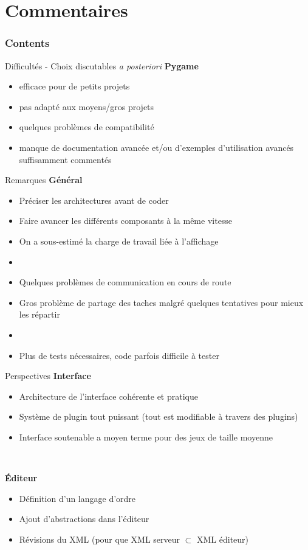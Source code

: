 \documentclass[11pt]{beamer}
\begin{document}
\section{Commentaires}

    \begin{frame}
        \frametitle{Contents}
        \tableofcontents[currentsection]
    \end{frame}
    
\begin{frame}{Difficultés - Choix discutables \textit{a posteriori}}
	\textbf{Pygame}
	\begin{itemize}
		\item efficace pour de petits projets
		\item pas adapté aux moyens/gros projets
		\item quelques problèmes de compatibilité
		\item manque de documentation avancée et/ou d'exemples d'utilisation avancés suffisamment commentés
	\end{itemize}
\end{frame}


\begin{frame}{Remarques}
	\textbf{Général}
	\begin{itemize}
		\item Préciser les architectures avant de coder
		\item Faire avancer les différents composants à la même vitesse
		\item On a sous-estimé la charge de travail liée à l'affichage
		\item[]
		\item Quelques problèmes de communication en cours de route
		\item Gros problème de partage des taches malgré quelques tentatives pour mieux les répartir
		\item[]
		\item Plus de tests nécessaires, code parfois difficile à tester
	\end{itemize}
\end{frame}


\begin{frame}{Perspectives}
	\textbf{Interface}
	\begin{itemize}
		\item Architecture de l'interface cohérente et pratique
		\item Système de plugin tout puissant (tout est modifiable à travers des plugins)
		\item Interface soutenable a moyen terme pour des jeux de taille moyenne
	\end{itemize}
	
	~
	
	\textbf{Éditeur}
	\begin{itemize}
		\item Définition d'un langage d'ordre
		\item Ajout d'abstractions dans l'éditeur
		\item Révisions du XML (pour que XML serveur $\subset$ XML éditeur)
	\end{itemize}
\end{frame}
\end{document}
